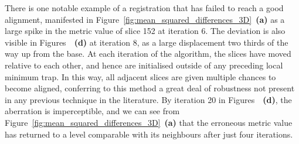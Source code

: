   There is one notable example of a registration that has failed to reach a good alignment, manifested in Figure~\ref{fig:mean_squared_differences_3D}~\textbf{(a)} as a large spike in the metric value of slice 152 at iteration 6. The deviation is also visible in Figures~~\textbf{(d)} at iteration 8, as a large displacement two thirds of the way up from the base. At each iteration of the algorithm, the slices have moved relative to each other, and hence are initialised outside of any preceding local minimum trap. In this way, all adjacent slices are given multiple chances to become aligned, conferring to this method a great deal of robustness not present in any previous technique in the literature. By iteration 20 in Figures~~\textbf{(d)}, the aberration is imperceptible, and we can see from Figure~\ref{fig:mean_squared_differences_3D}~\textbf{(a)} that the erroneous metric value has returned to a level comparable with its neighbours after just four iterations.
  
